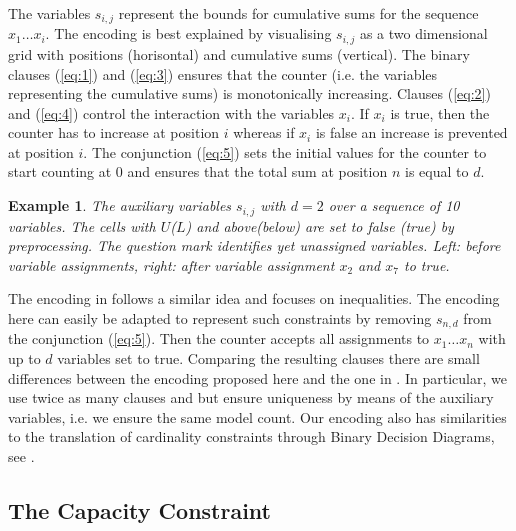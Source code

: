 \documentclass[]{easychair}
\newtheorem{example}[theorem]{Example}
\begin{document}
The variables $s_{i,j}$  represent the bounds for cumulative sums for the sequence $x_1 \ldots x_i$. The encoding is
best explained by visualising $s_{i,j}$ as a two dimensional grid with positions (horisontal) and cumulative sums
(vertical). The binary clauses (\ref{eq:1}) and (\ref{eq:3}) ensures that the counter (i.e. the variables representing
the cumulative sums) is monotonically increasing. Clauses (\ref{eq:2}) and (\ref{eq:4}) control the interaction with the
variables $x_i$. If $x_i$ is true, then the counter has to increase at position $i$ whereas if $x_i$ is false an
increase is prevented at position $i$. The conjunction (\ref{eq:5}) sets the initial values for the counter to start
counting at 0 and ensures that the total sum at position $n$ is equal to $d$. 


\begin{example}
The auxiliary variables $s_{i,j}$ with $d=2$ over a sequence of 10 variables. The cells with  $U$($L$) and
above(below) are set to false (true) by preprocessing. The question mark identifies yet unassigned variables. Left:
before variable assignments, right: after variable assignment $x_2$ and $x_7$ to true.
\begin{center}
\begin{minipage}[t]{0.5\textwidth}

\end{minipage}%
\begin{minipage}[t]{0.5\textwidth}

\end{minipage}
\end{center}
\label{ex:1}
\end{example}

The encoding in \cite{Sinz05} follows a similar idea and focuses on inequalities. The encoding here can easily be
adapted to represent such constraints by removing $s_{n,d}$ from the conjunction (\ref{eq:5}). Then the counter accepts
all assignments to $x_1 \ldots x_n$ with up to $d$ variables set to true. Comparing the resulting clauses there are
small differences between the encoding proposed here and the one in \cite{Sinz05}. In particular, we use twice as many
clauses and but ensure uniqueness by means of the auxiliary variables, i.e. we ensure the same model count. Our encoding
also has similarities to the translation of cardinality constraints through Binary Decision Diagrams, see \cite{Een06}.

\subsection{The Capacity Constraint}
\label{sub-capacity}
\end{document}
